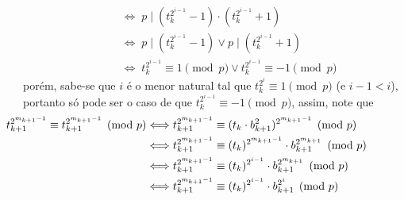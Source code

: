 \begin{enumerate}
\begin{itemize}
\begin{itemize}
\begin{itemize}
\begin{align*}
                            & \; \Longleftrightarrow \; p \mid (t_k^{2^{i-1}} - 1) \cdot (t_k^{2^{i-1}} + 1)
                            \\
                            & \; \Longleftrightarrow \; p \mid (t_k^{2^{i-1}} - 1) \lor p \mid (t_k^{2^{i-1}} + 1)
                            \\
                            & \; \Longleftrightarrow \; t_k^{2^{i-1}} \equiv 1 \pmod{p} \lor t_k^{2^{i-1}} \equiv -1 \pmod{p}
                        \end{align*}
                        porém, sabe-se que $i$ é o menor natural tal que $t_k^{2^i} \equiv 1 \pmod{p}$ (e $i - 1 < i$), portanto só pode ser o caso de que
                        $t_k^{2^{i-1}} \equiv -1 \pmod{p}$, assim, note que
                        \begin{align*}
                            \hspace*{\dimexpr-\leftmargini-\leftmarginii-\leftmarginiii}
                            t_{k+1}^{2^{m_{k+1} - 1}} \equiv t_{k+1}^{2^{m_{k+1} - 1}}  \pmod{p}
                            &
                            \Longleftrightarrow
                            t_{k+1}^{2^{m_{k+1} - 1}} \equiv (t_k \cdot b_{k+1}^2)^{2^{m_{k+1} - 1}} \pmod{p}
                            \\
                            &
                            \Longleftrightarrow
                            t_{k+1}^{2^{m_{k+1} - 1}}
                            \equiv (t_k)^{2^{m_{k+1} - 1}} \cdot b_{k+1}^{2^{m_{k+1}}} \pmod{p}
                            \\
                            &
                            \Longleftrightarrow
                            t_{k+1}^{2^{m_{k+1} - 1}}
                            \equiv (t_k)^{2^{i - 1}} \cdot b_{k+1}^{2^{m_{k+1}}} \pmod{p}
                            \\
                            &
                            \Longleftrightarrow
                            t_{k+1}^{2^{m_{k+1} - 1}}
                            \equiv (t_k)^{2^{i - 1}} \cdot b_{k+1}^{2^{i}} \pmod{p}
                            \\

\end{align*}
\end{itemize}
\end{itemize}
\end{itemize}
\end{enumerate}
